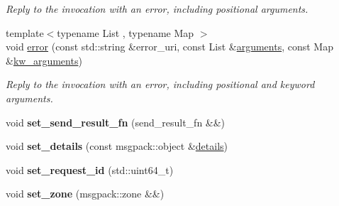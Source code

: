 \begin{DoxyCompactItemize}
\begin{DoxyCompactList}\small\item\em Reply to the invocation with an error, including positional arguments. \end{DoxyCompactList}\item 
{\footnotesize template$<$typename List , typename Map $>$ }\\void \hyperlink{classautobahn_1_1wamp__invocation__impl_a8cd87c0ddb29faa685882b297c40b6d2}{error} (const std\+::string \&error\+\_\+uri, const List \&\hyperlink{classautobahn_1_1wamp__invocation__impl_aa310c722287e63499c6d30cc8e308cba}{arguments}, const Map \&\hyperlink{classautobahn_1_1wamp__invocation__impl_a29184a2573d07b389bc25bfa3444c112}{kw\+\_\+arguments})\hypertarget{classautobahn_1_1wamp__invocation__impl_a8cd87c0ddb29faa685882b297c40b6d2}{}\label{classautobahn_1_1wamp__invocation__impl_a8cd87c0ddb29faa685882b297c40b6d2}

\begin{DoxyCompactList}\small\item\em Reply to the invocation with an error, including positional and keyword arguments. \end{DoxyCompactList}\item 
void {\bfseries set\+\_\+send\+\_\+result\+\_\+fn} (send\+\_\+result\+\_\+fn \&\&)\hypertarget{classautobahn_1_1wamp__invocation__impl_ae4483afeb76f50ce367b2a3dbe65773e}{}\label{classautobahn_1_1wamp__invocation__impl_ae4483afeb76f50ce367b2a3dbe65773e}

\item 
void {\bfseries set\+\_\+details} (const msgpack\+::object \&\hyperlink{classautobahn_1_1wamp__invocation__impl_a6013b21bcf71387c88bc4248412a034e}{details})\hypertarget{classautobahn_1_1wamp__invocation__impl_ad9ffbb22a2323452f322572bb3b9c29c}{}\label{classautobahn_1_1wamp__invocation__impl_ad9ffbb22a2323452f322572bb3b9c29c}

\item 
void {\bfseries set\+\_\+request\+\_\+id} (std\+::uint64\+\_\+t)\hypertarget{classautobahn_1_1wamp__invocation__impl_a334d8f02f5e3dd4727a8a68c6040b524}{}\label{classautobahn_1_1wamp__invocation__impl_a334d8f02f5e3dd4727a8a68c6040b524}

\item 
void {\bfseries set\+\_\+zone} (msgpack\+::zone \&\&)\hypertarget{classautobahn_1_1wamp__invocation__impl_a2fa2140933c16d0d26d835e53d988ec2}{}\label{classautobahn_1_1wamp__invocation__impl_a2fa2140933c16d0d26d835e53d988ec2}


\end{DoxyCompactItemize}

